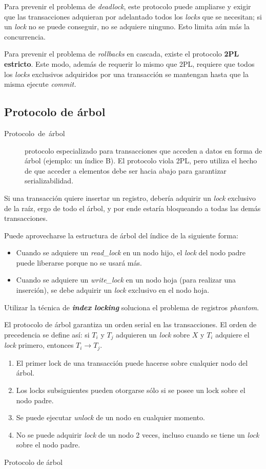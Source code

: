 \documentclass[a4paper, twoside]{article}
\begin{document}
Para prevenir el problema de \emph{deadlock}, este protocolo puede
ampliarse y exigir que las transacciones adquieran por adelantado
todos los \emph{locks} que se necesitan; si un \emph{lock} no se puede
conseguir, no se adquiere ninguno. Esto limita aún más la concurrencia.

Para prevenir el problema de \emph{rollbacks} en cascada, existe el
protocolo\textbf{ 2PL estricto}. Este modo, además de requerir lo
mismo que 2PL, requiere que todos los \emph{locks} exclusivos adquiridos
por una transacción se mantengan hasta que la misma ejecute \emph{commit.}


\subsection{Protocolo de árbol}
\begin{description}
\item [{Protocolo~de~árbol}] protocolo especializado para transacciones
que acceden a datos en forma de árbol (ejemplo: un índice B). El protocolo
viola 2PL, pero utiliza el hecho de que acceder a elementos debe ser
hacia abajo para garantizar serializabilidad.
\end{description}
Si una transacción quiere insertar un registro, debería adquirir un
\emph{lock} exclusivo de la raíz, ergo de todo el árbol, y por ende
estaría bloqueando a todas las demás transacciones.

Puede aprovecharse la estructura de árbol del índice de la siguiente
forma:
\begin{itemize}
\item Cuando se adquiere un \emph{read\_lock} en un nodo hijo, el \emph{lock}
del nodo padre puede liberarse porque no se usará más.
\item Cuando se adquiere un \emph{write\_lock} en un nodo hoja (para realizar
una inserción), se debe adquirir un \emph{lock }exclusivo en el nodo
hoja.
\end{itemize}
Utilizar la técnica de \textbf{\emph{index locking}} soluciona el
problema de registros \emph{phantom}.

El protocolo de árbol garantiza un orden serial en las transacciones.
El orden de precedencia se define así: si $T_{i}$ y $T_{j}$ adquieren
un \emph{lock }sobre $X$ y $T_{i}$ adquiere el \emph{lock }primero,
entonces $T_{i}\to T_{j}$.

\begin{algorithm}[H]
\begin{enumerate}
\item El primer lock de una transacción puede hacerse sobre cualquier nodo
del árbol.
\item Los locks subsiguientes pueden otorgarse sólo si se posee un lock
sobre el nodo padre.
\item Se puede ejecutar \emph{unlock} de un nodo en cualquier momento.
\item No se puede adquirir \emph{lock} de un nodo 2 veces, incluso cuando
se tiene un \emph{lock }sobre el nodo padre.
\end{enumerate}
\protect\caption{Protocolo de árbol}


\end{algorithm}
\end{document}
